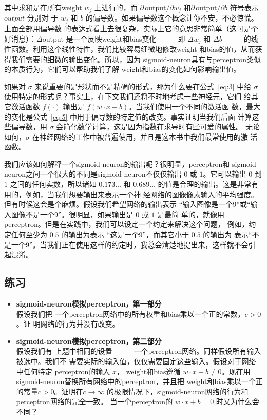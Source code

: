 其中求和是在所有\gls*{weight} $w_j$ 上进行的，而 $\partial \, \mbox{output} /
\partial w_j$ 和$\partial \, \mbox{output} /\partial b$ 符号表示 $output$ 分别对
于 $w_j$ 和 $b$ 的偏导数。如果偏导数这个概念让你不安，不必惊慌。上面全部用偏导数
的表达式看上去很复杂，实际上它的意思非常简单（这可是个好消息）：$\Delta
\mbox{output}$ 是一个反映\gls*{weight}和\gls*{bias}变化~——~即 $\Delta w_j$ 和
$\Delta b$~——~的线性函数。利用这个线性特性，我们比较容易细微地修改\gls*{weight}
和\gls*{bias}的值，从而获得我们需要的细微的输出变化。所以，因为%
\gls*{sigmoid-neuron}具有与\gls*{perceptron}类似的本质行为，它们可以帮助我们了解%
\gls*{weight}和\gls*{bias}的变化如何影响输出值。

如果对 $\sigma$ 来说重要的是形状而不是精确的形式，那为什么要在公式~\eqref{eq:3}
中给 $\sigma$ 使用特定的形式呢？事实上，在下文我们还将不时地考虑一些神经元，它们
给其它激活函数 $f(\cdot)$ 输出是 $f(w \cdot x + b)$。当我们使用一个不同的激活函
数，最大的变化是公式~\eqref{eq:5} 中用于偏导数的特定值的改变。事实证明当我们后面
计算这些偏导数，用 $\sigma$ 会简化数学计算，这是因为指数在求导时有些可爱的属性。
无论如何，$\sigma$ 在神经网络的工作中被普遍使用，并且是这本书中我们最常使用的激
活函数。

我们应该如何解释一个\gls*{sigmoid-neuron}的输出呢？很明显，\gls*{perceptron}和%
\gls*{sigmoid-neuron}之间一个很大的不同是\gls*{sigmoid-neuron}不仅仅输出 $0$ 或
$1$。它可以输出 $0$ 到 $1$ 之间的任何实数，所以诸如 $0.173\ldots$ 和
$0.689\ldots$ 的值是合理的输出。这是非常有用的，例如，当我们想要输出来表示一个神
经网络的图像像素输入的平均强度。但有时候这会是个麻烦。假设我们希望网络的输出表示
“输入图像是一个9”或“输入图像不是一个9”。很明显，如果输出是 $0$ 或 $1$ 是最简
单的，就像用\gls*{perceptron}。但是在实践中，我们可以设定一个约定来解决这个问题，
例如，约定任何至少为 $0.5$ 的输出为表示 “这是一个9”，而其它小于 $0.5$ 的输出为
表示“不是一个9”。当我们正在使用这样的约定时，我总会清楚地提出来，这样就不会引
起混淆。

\subsection*{练习}

\begin{itemize}
\item \textbf{\gls*{sigmoid-neuron}模拟\gls*{perceptron}，第一部分}\\假设我们把
  一个\gls*{perceptron}网络中的所有权重和\gls*{bias}乘以一个正的常数，$c>0$。证
  明网络的行为并没有改变。
\item \textbf{\gls*{sigmoid-neuron}模拟\gls*{perceptron}，第二部分}\\假设我们有
  上题中相同的设置~——~一个\gls*{perceptron}网络。同样假设所有输入被选中。我们不
  需要实际的输入值，仅仅需要固定这些输入。假设对于网络中任何特定%
  \gls*{perceptron}的输入 $x$， \gls*{weight}和\gls*{bias}遵循 $w \cdot x + b
  \neq 0$。现在用\gls*{sigmoid-neuron}替换所有网络中的\gls*{perceptron}，并且把%
  \gls*{weight}和\gls*{bias}乘以一个正的常量$c>0$。证明在$c \rightarrow \infty$
  的极限情况下，\gls*{sigmoid-neuron}网络的行为和\gls*{perceptron}网络的完全一致。
  当一个\gls*{perceptron}的 $w \cdot x + b = 0$ 时又为什么会不同？
\end{itemize}

